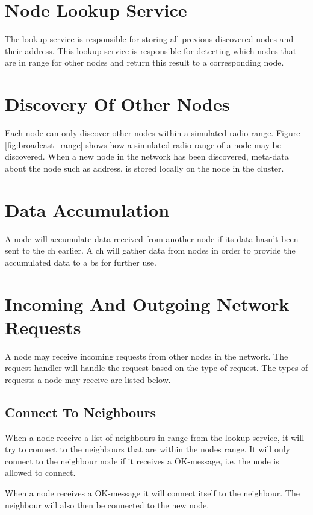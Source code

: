 \documentclass[USenglish]{uit-thesis}
\begin{document}
\section{Node Lookup Service} \label{sec:nodeLS}
The lookup service is responsible for storing all previous discovered nodes and their address. This lookup service is responsible for detecting which nodes that are in range for other nodes and return this result to a corresponding node. 



\section{Discovery Of Other Nodes} \label{sec:discON}
Each node can only discover other nodes within a simulated radio range. Figure \ref{fig:broadcast_range} shows how a simulated radio range of a node may be discovered. When a new node in the network has been discovered, meta-data about the node such as address, is stored locally on the node in the cluster.


\section{Data Accumulation}
A node will accumulate data received from another node if its data hasn't been sent to the \gls{ch} earlier. A \gls{ch} will gather data from nodes in order to provide the accumulated data to a \gls{bs} for further use.


\section{Incoming And Outgoing Network Requests}
A node may receive incoming requests from other nodes in the network. The request handler will handle the request based on the type of request. The types of requests a node may receive are listed below.

\subsection{Connect To Neighbours}
When a node receive a list of neighbours in range from the lookup service, it will try to connect to the neighbours that are within the nodes range. It will only connect to the neighbour node if it receives a OK-message, i.e. the node is allowed to connect.

When a node receives a OK-message it will connect itself to the neighbour. The neighbour will also then be connected to the new node.
\end{document}
